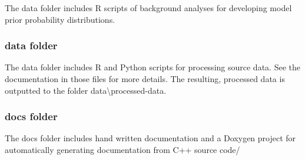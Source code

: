The {\ttfamily data} folder includes R scripts of background analyses for developing model prior probability distributions.

\subsubsection*{{\ttfamily data} folder}

The {\ttfamily data} folder includes R and Python scripts for processing source data. See the documentation in those files for more details. The resulting, processed data is outputted to the folder {\ttfamily data\textbackslash{}processed-\/data}.

\subsubsection*{{\ttfamily docs} folder}

The {\ttfamily docs} folder includes hand written documentation and a Doxygen project for automatically generating documentation from C++ source code/ 